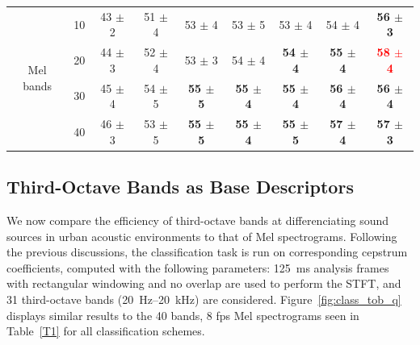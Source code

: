 \documentclass[sensors,article,accept,moreauthors,pdftex,10pt,a4paper]{mdpi}
\begin{document}
\begin{table}[H]
\begin{tabular}{ccccccccc}
\midrule

\multicolumn{1}{c}{\multirow{4}{*}{Mel bands}}
 & \multicolumn{1}{c}{10} &43 $\pm$ 2 & 51 $\pm$ 4 & 53 $\pm$ 4 & 53 $\pm$ 5 & 53 $\pm$ 4 & 54 $\pm$ 4 & \textbf{56 $\pm$ 3} \\
\multicolumn{1}{c}{}
 & \multicolumn{1}{c}{20} & 44 $\pm$ 3 & 52 $\pm$ 4 & 53 $\pm$ 3 & 54 $\pm$ 4 & \textbf{54 $\pm$ 4} & \textbf{55 $\pm$ 4} & \textbf{\textcolor{red}{58 $\pm$ 4}} \\
\multicolumn{1}{c}{}
 & \multicolumn{1}{c}{30} & 45 $\pm$ 4 & 54 $\pm$ 5 & \textbf{55 $\pm$ 5} & \textbf{55 $\pm$ 4} & \textbf{55 $\pm$ 4} & \textbf{56 $\pm$ 4} & \textbf{56 $\pm$ 4} \\
\multicolumn{1}{c}{}
 & \multicolumn{1}{c}{40} & 46 $\pm$ 3 & 53 $\pm$ 5 & \textbf{55 $\pm$ 5} & \textbf{55 $\pm$ 4} & \textbf{55 $\pm$ 5} & \textbf{57 $\pm$ 4} & \textbf{57 $\pm$ 3} \\
 \bottomrule
\end{tabular}

\end{table}



\subsection{Third-Octave Bands as Base Descriptors} \label{sec:tob_r}

We now compare the efficiency of third-octave bands at differenciating sound sources in urban acoustic environments to that of Mel spectrograms. Following the previous discussions, the classification task is run on corresponding cepstrum coefficients, computed with the following parameters: 125~ms analysis frames with rectangular windowing and no overlap are used to perform the STFT, and 31 third-octave bands (20~Hz--20~kHz) are considered. Figure~\ref{fig:class_tob_q} displays similar results to the 40 bands, 8 fps Mel spectrograms seen in Table~\ref{T1} for all classification schemes.
\end{document}
